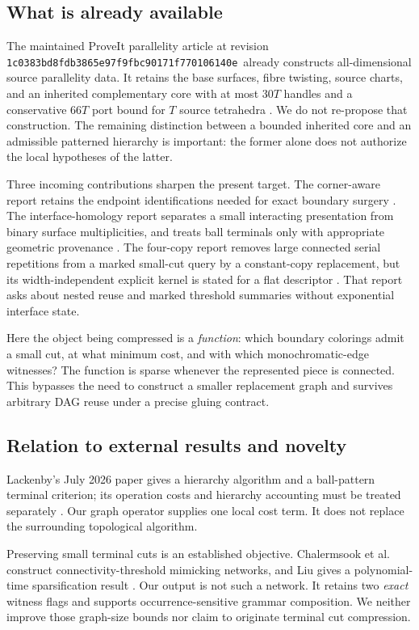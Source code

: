 \documentclass[11pt,a4paper]{article}
\theoremstyle{definition}
\theoremstyle{remark}
\newcommand{\code}[1]{\nolinkurl{#1}}
\newcommand{\pin}{\code{1c0383bd8fdb3865e97f9fbc90171f770106140e}}
\begin{document}
\subsection{What is already available}
The maintained ProveIt parallelity article at revision \pin\ already constructs all-dimensional source parallelity data. It retains the base surfaces, fibre twisting, source charts, and an inherited complementary core with at most $30T$ handles and a conservative $66T$ port bound for $T$ source tetrahedra \cite{parallelity}. We do not re-propose that construction. The remaining distinction between a bounded inherited core and an admissible patterned hierarchy is important: the former alone does not authorize the local hypotheses of the latter.

Three incoming contributions sharpen the present target. The corner-aware report retains the endpoint identifications needed for exact boundary surgery \cite{corners}. The interface-homology report separates a small interacting presentation from binary surface multiplicities, and treats ball terminals only with appropriate geometric provenance \cite{homology}. The four-copy report removes large connected serial repetitions from a marked small-cut query by a constant-copy replacement, but its width-independent explicit kernel is stated for a flat descriptor \cite{fourcopy}. That report asks about nested reuse and marked threshold summaries without exponential interface state.

Here the object being compressed is a \emph{function}: which boundary colorings admit a small cut, at what minimum cost, and with which monochromatic-edge witnesses? The function is sparse whenever the represented piece is connected. This bypasses the need to construct a smaller replacement graph and survives arbitrary DAG reuse under a precise gluing contract.

\subsection{Relation to external results and novelty}
Lackenby's July 2026 paper gives a hierarchy algorithm and a ball-pattern terminal criterion; its operation costs and hierarchy accounting must be treated separately \cite{lackenby2026}. Our graph operator supplies one local cost term. It does not replace the surrounding topological algorithm.

Preserving small terminal cuts is an established objective. Chalermsook et al. construct connectivity-threshold mimicking networks, and Liu gives a polynomial-time sparsification result \cite{chalermsook,liu}. Our output is not such a network. It retains two \emph{exact} witness flags and supports occurrence-sensitive grammar composition. We neither improve those graph-size bounds nor claim to originate terminal cut compression.
\end{document}
